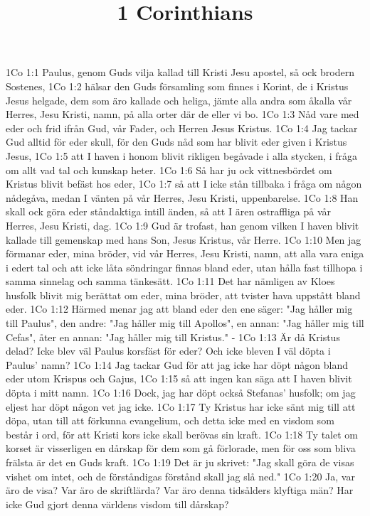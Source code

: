 

\title{1 Corinthians}

1Co 1:1  Paulus, genom Guds vilja kallad till Kristi Jesu apostel, så ock brodern Sostenes,
1Co 1:2  hälsar den Guds församling som finnes i Korint, de i Kristus Jesus helgade, dem som äro kallade och heliga, jämte alla andra som åkalla vår Herres, Jesu Kristi, namn, på alla orter där de eller vi bo.
1Co 1:3  Nåd vare med eder och frid ifrån Gud, vår Fader, och Herren Jesus Kristus.
1Co 1:4  Jag tackar Gud alltid för eder skull, för den Guds nåd som har blivit eder given i Kristus Jesus,
1Co 1:5  att I haven i honom blivit rikligen begåvade i alla stycken, i fråga om allt vad tal och kunskap heter.
1Co 1:6  Så har ju ock vittnesbördet om Kristus blivit befäst hos eder,
1Co 1:7  så att I icke stån tillbaka i fråga om någon nådegåva, medan I vänten på vår Herres, Jesu Kristi, uppenbarelse.
1Co 1:8  Han skall ock göra eder ståndaktiga intill änden, så att I ären ostraffliga på vår Herres, Jesu Kristi, dag.
1Co 1:9  Gud är trofast, han genom vilken I haven blivit kallade till gemenskap med hans Son, Jesus Kristus, vår Herre.
1Co 1:10  Men jag förmanar eder, mina bröder, vid vår Herres, Jesu Kristi, namn, att alla vara eniga i edert tal och att icke låta söndringar finnas bland eder, utan hålla fast tillhopa i samma sinnelag och samma tänkesätt.
1Co 1:11  Det har nämligen av Kloes husfolk blivit mig berättat om eder, mina bröder, att tvister hava uppstått bland eder.
1Co 1:12  Härmed menar jag att bland eder den ene säger: "Jag håller mig till Paulus", den andre: "Jag håller mig till Apollos", en annan: "Jag håller mig till Cefas", åter en annan: "Jag håller mig till Kristus." -
1Co 1:13  Är då Kristus delad? Icke blev väl Paulus korsfäst för eder? Och icke bleven I väl döpta i Paulus' namn?
1Co 1:14  Jag tackar Gud för att jag icke har döpt någon bland eder utom Krispus och Gajus,
1Co 1:15  så att ingen kan säga att I haven blivit döpta i mitt namn.
1Co 1:16  Dock, jag har döpt också Stefanas' husfolk; om jag eljest har döpt någon vet jag icke.
1Co 1:17  Ty Kristus har icke sänt mig till att döpa, utan till att förkunna evangelium, och detta icke med en visdom som består i ord, för att Kristi kors icke skall berövas sin kraft.
1Co 1:18  Ty talet om korset är visserligen en dårskap för dem som gå förlorade, men för oss som bliva frälsta är det en Guds kraft.
1Co 1:19  Det är ju skrivet: "Jag skall göra de visas vishet om intet, och de förståndigas förstånd skall jag slå ned."
1Co 1:20  Ja, var äro de visa? Var äro de skriftlärda? Var äro denna tidsålders klyftiga män? Har icke Gud gjort denna världens visdom till dårskap?
